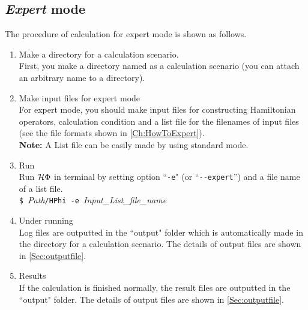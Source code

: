 \subsection{{\it Expert} mode}
The procedure of calculation for expert mode is shown as follows.
 \begin{enumerate}
   \item  Make a directory for a calculation scenario. \\
First, you make a directory named as a calculation scenario (you can attach an arbitrary name to a directory).
   \item  Make input files for expert mode\\
For expert mode,  you should make input files 
for constructing Hamiltonian operators, calculation condition and 
a list file for the filenames of input files (see the file formats shown in  \ref{Ch:HowToExpert}). \\
{\bf Note:} A List file can be easily made by using standard mode.
 \item  Run\\
Run $\mathcal{H} \Phi$ in terminal by setting option ``\verb|-e|" (or ``\verb|--expert|'') and a file name of a list file.\\
\verb|$ |\textit{Path}\verb|/HPhi -e |\textit{Input\_List\_file\_name}


\item Under running\\
Log files are outputted in the ``output" folder which is automatically made in the directory for a calculation scenario.
The details of output files are shown in \ref{Sec:outputfile}.

\item Results\\
If the calculation is finished normally, the result files are outputted in  the ``output" folder. The details of output files are shown in \ref{Sec:outputfile}.
\end{enumerate}
